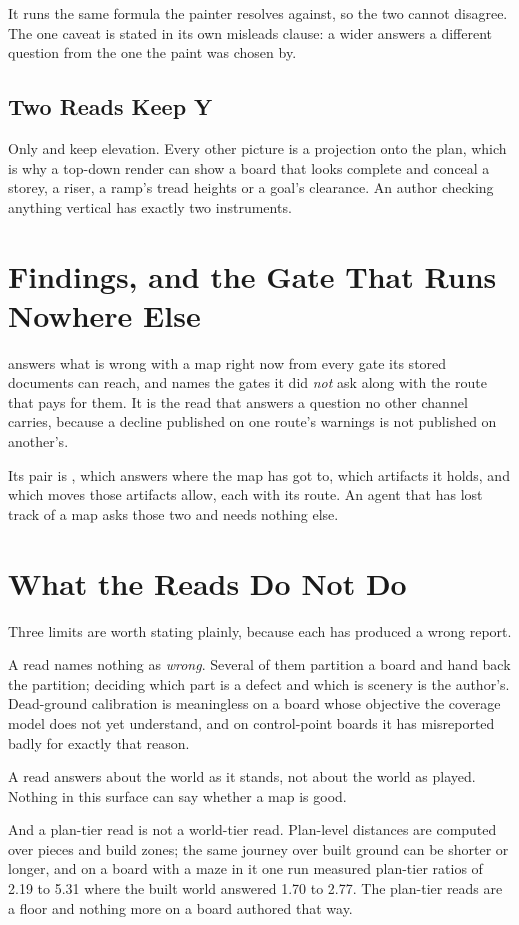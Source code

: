 It runs the same formula the painter resolves against, so the two cannot disagree.
The one caveat is stated in its own misleads clause: a wider  answers a
different question from the one the paint was chosen by.

\subsection{Two Reads Keep Y}

Only  and  keep elevation. Every other picture is a
projection onto the plan, which is why a top-down render can show a board that looks
complete and conceal a storey, a riser, a ramp's tread heights or a goal's
clearance. An author checking anything vertical has exactly two instruments.

\section{Findings, and the Gate That Runs Nowhere Else}

 answers what is wrong with a map right now from
every gate its stored documents can reach, and names the gates it did \emph{not}
ask along with the route that pays for them. It is the read that answers a question
no other channel carries, because a decline published on one route's warnings is
not published on another's.

Its pair is , which answers where the map has got
to, which artifacts it holds, and which moves those artifacts allow, each with its
route. An agent that has lost track of a map asks those two and needs nothing else.

\section{What the Reads Do Not Do}

Three limits are worth stating plainly, because each has produced a wrong report.

A read names nothing as \emph{wrong}. Several of them partition a board and hand
back the partition; deciding which part is a defect and which is scenery is the
author's. Dead-ground calibration is meaningless on a board whose objective the
coverage model does not yet understand, and on control-point boards it has
misreported badly for exactly that reason.

A read answers about the world as it stands, not about the world as played. Nothing
in this surface can say whether a map is good.

And a plan-tier read is not a world-tier read. Plan-level distances are computed
over pieces and build zones; the same journey over built ground can be shorter or
longer, and on a board with a maze in it one run measured plan-tier ratios of 2.19
to 5.31 where the built world answered 1.70 to 2.77. The plan-tier reads are a floor
and nothing more on a board authored that way.
